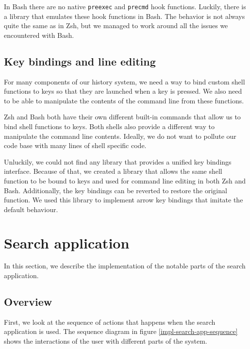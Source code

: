 In Bash there are no native \verb|preexec| and \verb|precmd| hook functions. Luckily, there is a library \cite{lib-bash-preexec} that emulates these hook functions in Bash. The behavior is not always quite the same as in Zsh, but we managed to work around all the issues we encountered with Bash. 

\subsection{Key bindings and line editing}

For many components of our history system, we need a way to bind custom shell functions to keys so that they are launched when a key is pressed. We also need to be able to manipulate the contents of the command line from these functions.

Zsh and Bash both have their own different built-in commands that allow us to bind shell functions to keys. Both shells also provide a different way to manipulate the command line contents. Ideally, we do not want to pollute our code base with many lines of shell specific code.

Unluckily, we could not find any library that provides a unified key bindings interface. Because of that, we created a library\cite{lib-bash-zsh-compat-widgets} that allows the same shell function to be bound to keys and used for command line editing in both Zsh and Bash. Additionally, the key bindings can be reverted to restore the original function.
We used this library to implement arrow key bindings that imitate the default behaviour.



\section{Search application}

In this section, we describe the implementation of the notable parts of the search application. 

\subsection{Overview}

First, we look at the sequence of actions that happens when the search application is used. The sequence diagram in figure \ref{impl-search-app-sequence} shows the interactions of the user with different parts of the system.

